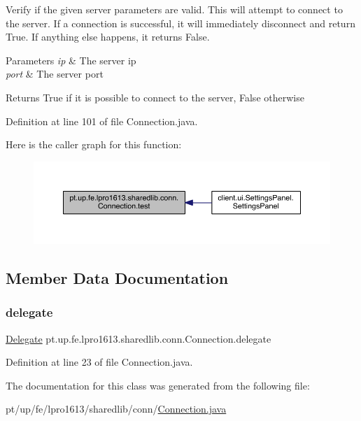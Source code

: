 Verify if the given server parameters are valid. This will attempt to connect to the server. If a connection is successful, it will immediately disconnect and return True. If anything else happens, it returns False.


\begin{DoxyParams}{Parameters}
{\em ip} & The server ip \\
\hline
{\em port} & The server port \\
\hline
\end{DoxyParams}
\begin{DoxyReturn}{Returns}
True if it is possible to connect to the server, False otherwise 
\end{DoxyReturn}


Definition at line 101 of file Connection.\+java.

Here is the caller graph for this function\+:
\nopagebreak
\begin{figure}[H]
\begin{center}
\leavevmode
\includegraphics[width=350pt]{classpt_1_1up_1_1fe_1_1lpro1613_1_1sharedlib_1_1conn_1_1_connection_a9431e4e6dd9b16f463bd75079bd8c371_icgraph}
\end{center}
\end{figure}


\subsection{Member Data Documentation}
\hypertarget{classpt_1_1up_1_1fe_1_1lpro1613_1_1sharedlib_1_1conn_1_1_connection_ad0181759fff34ee0320a29111462ef94}{}\label{classpt_1_1up_1_1fe_1_1lpro1613_1_1sharedlib_1_1conn_1_1_connection_ad0181759fff34ee0320a29111462ef94} 
\subsubsection{\texorpdfstring{delegate}{delegate}}
{\footnotesize\ttfamily \hyperlink{interfacept_1_1up_1_1fe_1_1lpro1613_1_1sharedlib_1_1conn_1_1_connection_1_1_delegate}{Delegate} pt.\+up.\+fe.\+lpro1613.\+sharedlib.\+conn.\+Connection.\+delegate}



Definition at line 23 of file Connection.\+java.



The documentation for this class was generated from the following file\+:\begin{DoxyCompactItemize}
\item 
pt/up/fe/lpro1613/sharedlib/conn/\hyperlink{_connection_8java}{Connection.\+java}\end{DoxyCompactItemize}
